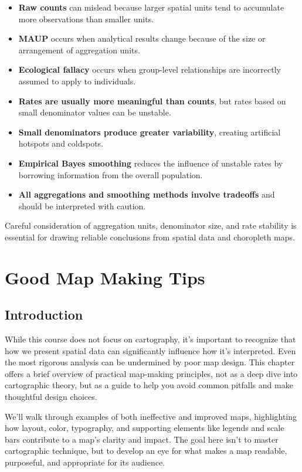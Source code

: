\documentclass[
  letterpaper,
]{book}
\providecommand{\tightlist}{%
  \setlength{\itemsep}{0pt}\setlength{\parskip}{0pt}}
\begin{document}
\begin{itemize}
\tightlist
\item
  \textbf{Raw counts} can mislead because larger spatial units tend to
  accumulate more observations than smaller units.
\item
  \textbf{MAUP} occurs when analytical results change because of the
  size or arrangement of aggregation units.
\item
  \textbf{Ecological fallacy} occurs when group-level relationships are
  incorrectly assumed to apply to individuals.
\item
  \textbf{Rates are usually more meaningful than counts}, but rates
  based on small denominator values can be unstable.
\item
  \textbf{Small denominators produce greater variability}, creating
  artificial hotspots and coldspots.
\item
  \textbf{Empirical Bayes smoothing} reduces the influence of unstable
  rates by borrowing information from the overall population.
\item
  \textbf{All aggregations and smoothing methods involve tradeoffs} and
  should be interpreted with caution.
\end{itemize}

Careful consideration of aggregation units, denominator size, and rate
stability is essential for drawing reliable conclusions from spatial
data and choropleth maps.

\chapter{Good Map Making Tips}\label{good-map-making-tips}

\section{Introduction}\label{introduction-6}

While this course does not focus on cartography, it's important to
recognize that how we present spatial data can significantly influence
how it's interpreted. Even the most rigorous analysis can be undermined
by poor map design. This chapter offers a brief overview of practical
map-making principles, not as a deep dive into cartographic theory, but
as a guide to help you avoid common pitfalls and make thoughtful design
choices.

We'll walk through examples of both ineffective and improved maps,
highlighting how layout, color, typography, and supporting elements like
legends and scale bars contribute to a map's clarity and impact. The
goal here isn't to master cartographic technique, but to develop an eye
for what makes a map readable, purposeful, and appropriate for its
audience.
\end{document}
